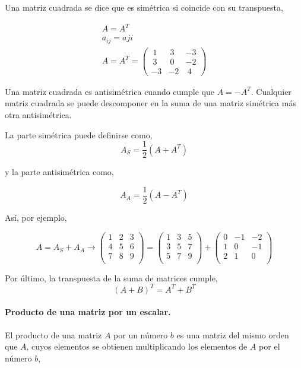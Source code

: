 Una matriz cuadrada se dice que es simétrica si coincide con su transpuesta,

\begin{gather*}
A=A^T\\
a_{ij}=a{ji}\\
A=A^T=
\begin{pmatrix}
\ 1&\ 3&-3\\
\ 3&\ 0&-2\\
-3&-2&\ 4
\end{pmatrix}
\end{gather*}

Una matriz cuadrada es antisimétrica cuando cumple que $A=-A^T$. Cualquier matriz cuadrada se puede descomponer en la suma de una matriz simétrica más otra antisimétrica.

La parte simétrica puede definirse como,
\begin{equation*}
A_S=\frac{1}{2} \left( A+A^T \right)
\end{equation*}

y la parte antisimétrica como,

\begin{equation*}
A_A=\frac{1}{2}\left( A-A^T \right)
\end{equation*}

Así, por ejemplo,

\begin{equation*}
 A=A_S+A_A \rightarrow
\begin{pmatrix}
1& 2& 3\\
4& 5& 6\\
7& 8& 9\\
\end{pmatrix} =
\begin{pmatrix}
1& 3& 5\\
3& 5& 7\\
5& 7& 9\\
\end{pmatrix} +
\begin{pmatrix}
0& -1& -2\\
1& 0& -1\\
2& 1& 0\\
\end{pmatrix}
\end{equation*}

Por último, la transpuesta de la suma de matrices cumple,
\begin{equation*}
(A+B)^T=A^T+B^T
\end{equation*}


\paragraph{Producto de una matriz por un escalar.} El producto de una matriz $A$ por un número $b$ es una matriz del mismo orden que $A$, cuyos elementos se obtienen multiplicando los elementos de $A$ por el número $b$,

